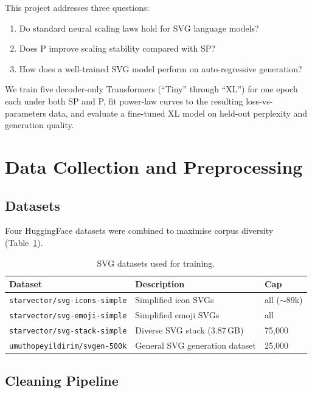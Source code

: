 \documentclass[11pt,a4paper]{article}
\begin{document}
This project addresses three questions:
\begin{enumerate}
  \item Do standard neural scaling laws hold for SVG language models?
  \item Does \textmu P improve scaling stability compared with SP?
  \item How does a well-trained SVG model perform on auto-regressive generation?
\end{enumerate}

We train five decoder-only Transformers (``Tiny'' through ``XL'') for one epoch each
under both SP and \textmu P, fit power-law curves to the resulting loss-vs-parameters
data, and evaluate a fine-tuned XL model on held-out perplexity and generation quality.

\section{Data Collection and Preprocessing}

\subsection{Datasets}

Four HuggingFace datasets were combined to maximise corpus diversity
(Table~\ref{tab:datasets}).

\begin{table}[H]
\centering
\caption{SVG datasets used for training.}
\label{tab:datasets}
\begin{tabular}{lll}
\toprule
\textbf{Dataset} & \textbf{Description} & \textbf{Cap} \\
\midrule
\texttt{starvector/svg-icons-simple}  & Simplified icon SVGs           & all ($\sim$89k) \\
\texttt{starvector/svg-emoji-simple}  & Simplified emoji SVGs          & all             \\
\texttt{starvector/svg-stack-simple}  & Diverse SVG stack (3.87\,GB)   & 75{,}000        \\
\texttt{umuthopeyildirim/svgen-500k}  & General SVG generation dataset & 25{,}000        \\
\bottomrule
\end{tabular}
\end{table}

\subsection{Cleaning Pipeline}
\end{document}
